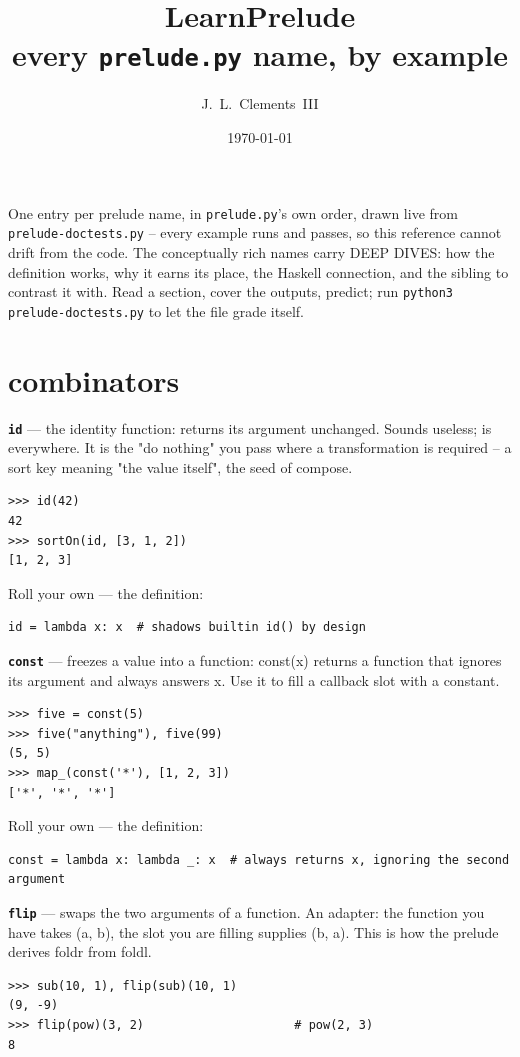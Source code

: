 \documentclass[10pt,letterpaper]{article}
\title{\Huge\bfseries LearnPrelude\\[6pt]
  \Large every \texttt{prelude.py} name, by example}
\author{J.~L.~Clements~III}
\date{\today}
\begin{document}
\maketitle

\noindent One entry per prelude name, in \texttt{prelude.py}'s own order,
drawn live from \texttt{prelude-doctests.py} -- every example runs and
passes, so this reference cannot drift from the code. The conceptually rich
names carry DEEP DIVES: how the definition works, why it earns its place,
the Haskell connection, and the sibling to contrast it with. Read a
section, cover the outputs, predict; run
\texttt{python3 prelude-doctests.py} to let the file grade itself.

\tableofcontents

\section{combinators}
\textbf{\texttt{id}} --- the identity function: returns its argument unchanged. Sounds useless; is everywhere. It is the "do nothing" you pass where a transformation is required -- a sort key meaning "the value itself", the seed of compose.
\begin{lstlisting}[style=ex]
>>> id(42)
42
>>> sortOn(id, [3, 1, 2])
[1, 2, 3]
\end{lstlisting}

Roll your own --- the definition:

\begin{lstlisting}[style=ex]
id = lambda x: x  # shadows builtin id() by design
\end{lstlisting}
\textbf{\texttt{const}} --- freezes a value into a function: const(x) returns a function that ignores its argument and always answers x. Use it to fill a callback slot with a constant.
\begin{lstlisting}[style=ex]
>>> five = const(5)
>>> five("anything"), five(99)
(5, 5)
>>> map_(const('*'), [1, 2, 3])
['*', '*', '*']
\end{lstlisting}

Roll your own --- the definition:

\begin{lstlisting}[style=ex]
const = lambda x: lambda _: x  # always returns x, ignoring the second argument
\end{lstlisting}
\textbf{\texttt{flip}} --- swaps the two arguments of a function. An adapter: the function you have takes (a, b), the slot you are filling supplies (b, a). This is how the prelude derives foldr from foldl.
\begin{lstlisting}[style=ex]
>>> sub(10, 1), flip(sub)(10, 1)
(9, -9)
>>> flip(pow)(3, 2)                     # pow(2, 3)
8
\end{lstlisting}
\end{document}
